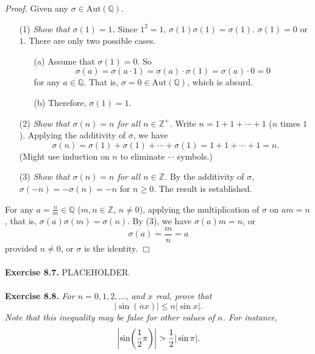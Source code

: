 \documentclass{article}
\begin{document}
\emph{Proof.}
Given any $\sigma \in \text{Aut}(\mathbb{Q})$.
\begin{enumerate}
\item[(1)]
\emph{Show that $\sigma(1) = 1$.}
Since $1^2 = 1$, $\sigma(1)\sigma(1) = \sigma(1)$. $\sigma(1) = 0$ or $1$.
There are only two possible cases.
  \begin{enumerate}
  \item[(a)]
  Assume that $\sigma(1) = 0$. So
  $$\sigma(a) = \sigma(a \cdot 1) = \sigma(a)\cdot \sigma(1) = \sigma(a) \cdot 0 = 0$$
  for any $a \in \mathbb{Q}$.
  That is, $\sigma = 0 \in \text{Aut}(\mathbb{Q})$, which is absurd.
  \item[(b)]
  Therefore, $\sigma(1) = 1$.
  \end{enumerate}
\item[(2)]
\emph{Show that $\sigma(n) = n$ for all $n \in \mathbb{Z}^+$.}
Write $n = 1 + 1 + \cdots + 1$ ($n$ times $1$).
Applying the additivity of $\sigma$, we have
$$\sigma(n) = \sigma(1) + \sigma(1) + \cdots + \sigma(1) = 1 + 1 + \cdots + 1 = n.$$
(Might use induction on $n$ to eliminate $\cdots$ symbols.)
\item[(3)]
\emph{Show that $\sigma(n) = n$ for all $n \in \mathbb{Z}$.}
By the additivity of $\sigma$, $\sigma(-n) = -\sigma(n) = -n$ for $n \geq 0$.
The result is established.
\end{enumerate}
For any $a = \frac{n}{m} \in \mathbb{Q}$ ($m, n \in \mathbb{Z}$, $n \neq 0$),
applying the multiplication of $\sigma$ on $am = n$,
that is,
$\sigma(a) \sigma(m) = \sigma(n)$. By (3), we have $\sigma(a)m = n$,
or $$\sigma(a) = \frac{m}{n} = a$$
provided $n \neq 0$,
or $\sigma$ is the identity.
$\Box$ \\\\





\textbf{Exercise 8.7.}
PLACEHOLDER. \\\\






\textbf{Exercise 8.8.}
\emph{For $n=0,1,2,\ldots$, and $x$ real, prove that
\[
  |\sin(nx)| \leq n |\sin x|.
\]
Note that this inequality may be false for other values of $n$.
For instance,
\[
  \abs{ \sin(\frac{1}{2} \pi) } > \frac{1}{2}|\sin \pi|.
\]} \\
\end{document}
